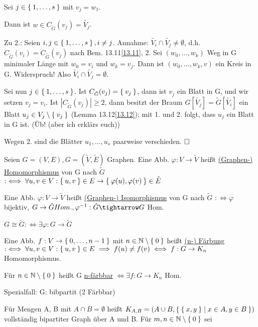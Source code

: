 \documentclass{../../meta/tudscript}
\begin{document}
Sei $j \in \Set{1, \ldots, s}$ mit $v_j = w_1$.

Dann ist $w \in C_{\tilde{G}} (v_j) = \tilde{V_j}$.

Zu 2.: Seien $i, j \in \Set{1, \ldots, s}, i \neq j$.
Annahme: $\tilde{V_i} \cap \tilde{V_j} \neq \emptyset$, d.h.
$C_{\tilde{G}} (v_i) = C_{\tilde{G}} (v_j)$ nach Bem. 13.11\ref{13.11}, 2. Sei $(w_0, \ldots, w_k)$ Weg in G minimaler Länge mit $w_0 = v_i$ und $w_k = v_j$. Dann ist 
$(w_0, \ldots, w_k, v)$ ein Kreis in G. Widerspruch! Also $\tilde{V_i} \cap \tilde{V_j} = \emptyset$.

Sei nun $j \in \Set{1, \ldots, s}$. Ist $C_{\tilde{G}} (v_j) = \Set{v_j}$, dann ist $v_j$ ein Blatt in G, und wir setzen $v_j = v_i$. Ist $|C_{\tilde{G}} (v_j)| \geq 2$,
dann besitzt der Braum $G [\tilde{V_j}] = \tilde{G} [\tilde{V_i}]$ ein Blatt $u_j \in V_j \setminus \Set{v_j}$ (Lemma 13.12\ref{13.12});
mit 1. und 2. folgt, dass $u_j$ ein Blatt in G ist. (Üb! (aber ich erklärs euch))

Wegen 2. sind die Blätter $u_1, \ldots, u_s$ paarweise verschieden. $\hfill\square$


Seien $G = (V, E), G = (\tilde{V}, \tilde{E})$ Graphen.
Eine Abb. $\varphi: V \rightarrow \tilde{V}$ 
heißt \underline{(Graphen-) Homomorphismus} von G nach $\tilde{G}$ $:\iff \forall u, v \in V: \Set{u,v} \in E \rightarrow \Set{\varphi (u), \varphi (v)} \in \tilde{E}$

Eine Abb. $\varphi: V \rightarrow \tilde{V}$ heißt
\underline{(Graphen-) Isomorphismus} von G nach $\tilde{G}$ $:\iff \varphi$ bijektiv, $G \rightarrow \tilde{G} Hom., \varphi^{-1}: \tilde{G} \tightarrow G$ Hom.

$G \cong \tilde{G} :\iff \exists \varphi: G \rightarrow \tilde{G}$ 

Eine Abb. $f: V \rightarrow \Set{0, \ldots, n-1}$ mit $n \in \mathbb{N} \setminus \Set{0}$ heißt \underline{(n-) Färbung} $:\iff \forall u,v \in V: \Set{u,v} \in E \implies f(u) \neq f(v) \iff f:G \rightarrow K_n$ Homomorphismus.

Für $n \in \mathbb{N} \setminus \Set{0}$ heißt G \underline{n-färbbar} $\iff \exists f: G \rightarrow K_n$ Hom.

Spezialfall:
G: bibpartit (2 Färbbar)

Für Mengen A, B mit $A \cap B = \emptyset$ heißt $K_{A, B} = (A \cup B, \Set{\Set{x, y} \mid x \in A, y \in B})$ vollständig bipartiter Graph über A und B.
Für $m, n \in \mathbb{N} \setminus \Set{0}$ sei 

\end{document}
